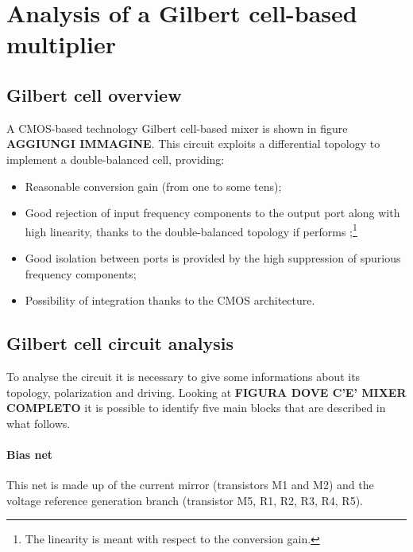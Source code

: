\section{Analysis of a Gilbert cell-based multiplier }

\subsection{Gilbert cell overview}
A CMOS-based technology Gilbert cell-based mixer is shown in figure \textbf{AGGIUNGI IMMAGINE}. This circuit exploits a differential topology to implement a double-balanced cell, providing:
\begin{itemize}
	\item Reasonable conversion gain (from one to some tens);
	\item Good rejection of input frequency components to the output port along with high linearity, thanks to the double-balanced topology if performs ;\footnote{The linearity is meant with respect to the conversion gain.}
	\item Good isolation between ports is provided by the high suppression of spurious frequency components;
	\item Possibility of integration thanks to the CMOS architecture.
\end{itemize}
\subsection{Gilbert cell circuit analysis}
To analyse the circuit it is necessary to give some informations about its topology, polarization and driving. Looking at\textbf{ FIGURA DOVE C'E' MIXER COMPLETO} it is possible to identify five main blocks that are described in what follows.
\paragraph{Bias net}

This net is made up of the current mirror (transistors M1 and M2) and the voltage reference generation branch (transistor M5, R1, R2, R3, R4, R5). 

